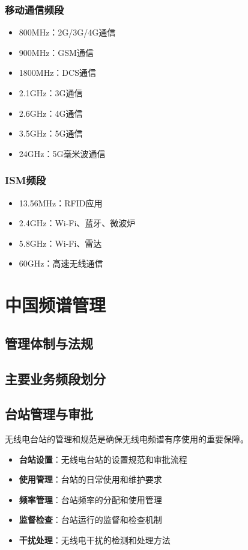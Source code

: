 \documentclass[12pt,UTF8]{ctexbook}
\begin{document}
\subsubsection{移动通信频段}
\begin{itemize}[leftmargin=3.5em]
    \item 800MHz：2G/3G/4G通信
    \item 900MHz：GSM通信
    \item 1800MHz：DCS通信
    \item 2.1GHz：3G通信
    \item 2.6GHz：4G通信
    \item 3.5GHz：5G通信
    \item 24GHz：5G毫米波通信
\end{itemize}

\subsubsection{ISM频段}
\begin{itemize}[leftmargin=3.5em]
    \item 13.56MHz：RFID应用
    \item 2.4GHz：Wi-Fi、蓝牙、微波炉
    \item 5.8GHz：Wi-Fi、雷达
    \item 60GHz：高速无线通信
\end{itemize}

\section{中国频谱管理}

\subsection{管理体制与法规}

\subsection{主要业务频段划分}

\subsection{台站管理与审批}
无线电台站的管理和规范是确保无线电频谱有序使用的重要保障。
\begin{itemize}[leftmargin=3.5em]
    \item \textbf{台站设置}：无线电台站的设置规范和审批流程
    \item \textbf{使用管理}：台站的日常使用和维护要求
    \item \textbf{频率管理}：台站频率的分配和使用管理
    \item \textbf{监督检查}：台站运行的监督和检查机制
    \item \textbf{干扰处理}：无线电干扰的检测和处理方法
\end{itemize}
\end{document}
